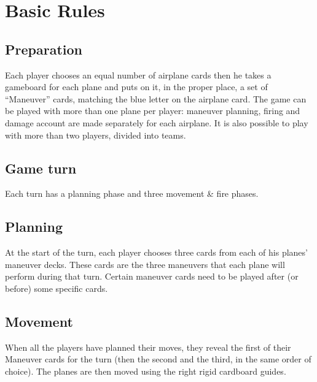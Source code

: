 \section{Basic Rules}
\subsection{Preparation}
Each player chooses an equal number of airplane cards then he takes a gameboard for each plane and puts on it, in the proper place, a set of “Maneuver” cards, matching the blue letter on the airplane card.
The game can be played with more than one plane per player: maneuver planning, firing and damage account are made separately for each airplane. It is also possible to play with more than two players, divided into teams.
\subsection{Game turn}
Each turn has a planning phase and three movement \& fire phases.
\subsection{Planning}
 At the start of the turn, each player chooses three cards from each of his planes’ maneuver decks. These cards are the three maneuvers that each plane will perform during that turn.
Certain maneuver cards need to be played after (or before) some specific cards.

\subsection{Movement}
When all the players have planned their moves, they reveal the first of their Maneuver cards for the turn (then the second and the third, in the same order of choice).
The planes are then moved using the right rigid cardboard guides.
